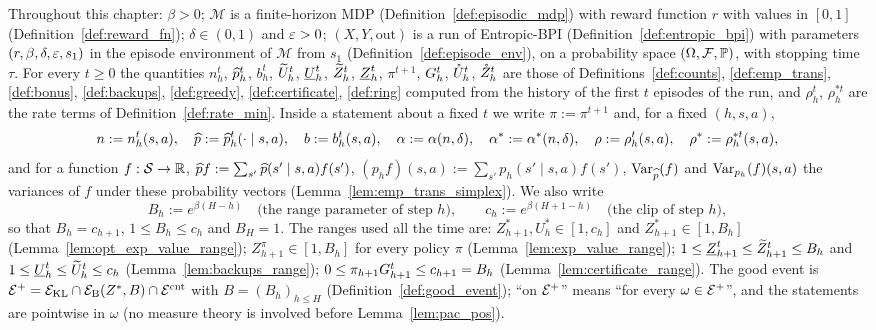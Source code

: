Throughout this chapter: $\beta > 0$; $\mathcal M$ is a finite-horizon MDP
(Definition~\ref{def:episodic_mdp}) with reward function $r$ with values in $[0, 1]$
(Definition~\ref{def:reward_fn}); $\delta \in (0, 1)$ and $\varepsilon > 0$; $(X, Y, \mathrm{out})$ is a run
of Entropic-BPI (Definition~\ref{def:entropic_bpi}) with parameters $(r, \beta, \delta, \varepsilon, s_1)$
in the episode environment of $\mathcal M$ from $s_1$ (Definition~\ref{def:episode_env}), on a
probability space $(\Omega, \mathcal F, \mathbb{P})$, with stopping time $\tau$. For every $t \ge 0$ the
quantities $n_h^t$, $\widehat{p}_h^t$, $b_h^t$, $\widetilde{U}_h^t$, $\underline{U}_h^t$, $\widetilde{Z}_h^t$, $\underline{Z}_h^t$, $\pi^{t+1}$,
$G_h^t$, $\mathring{U}_h^t$, $\mathring{Z}_h^t$ are those of Definitions~\ref{def:counts}, \ref{def:emp_trans},
\ref{def:bonus}, \ref{def:backups}, \ref{def:greedy}, \ref{def:certificate}, \ref{def:ring}
computed from the history of the first $t$ episodes of the run, and $\rho_h^t$, $\rho^{*t}_h$
are the rate terms of Definition~\ref{def:rate_min}. Inside a statement about a fixed $t$ we
write $\pi := \pi^{t+1}$ and, for a fixed $(h, s, a)$,
\[
  n := n_h^t(s,a), \quad \widehat{p} := \widehat{p}_h^t(\cdot \mid s, a), \quad b := b_h^t(s,a), \quad
  \alpha := \alpha(n, \delta), \quad \alpha^* := \alpha^*(n, \delta), \quad
  \rho := \rho_h^t(s,a), \quad \rho^* := \rho^{*t}_h(s,a),
\]
and for a function $f : \mathcal{S} \to \mathbb{R}$, $\widehat{p} f := \sum_{s'} \widehat{p}(s' \mid s,a) f(s')$,
$(p_h f)(s,a) := \sum_{s'} p_h(s' \mid s,a) f(s')$, $\operatorname{Var}_{\widehat{p}}(f)$ and $\operatorname{Var}_{p_h}(f)(s,a)$
the variances of $f$ under these probability vectors (Lemma~\ref{lem:emp_trans_simplex}).
We also write
\[
  B_h := e^{\beta (H - h)} \quad \text{(the range parameter of step $h$)}, \qquad
  c_h := e^{\beta (H + 1 - h)} \quad \text{(the clip of step $h$)},
\]
so that $B_h = c_{h+1}$, $1 \le B_h \le c_h$ and $B_H = 1$. The ranges used all the time are:
$Z^*_{h+1}, U^*_h \in [1, c_h]$ and $Z^*_{h+1} \in [1, B_h]$ (Lemma~\ref{lem:opt_exp_value_range});
$Z^\pi_{h+1} \in [1, B_h]$ for every policy $\pi$ (Lemma~\ref{lem:exp_value_range});
$1 \le \underline{Z}_{h+1}^t \le \widetilde{Z}_{h+1}^t \le B_h$ and $1 \le \underline{U}_h^t \le \widetilde{U}_h^t \le c_h$
(Lemma~\ref{lem:backups_range}); $0 \le \pi_{h+1}G_{h+1}^t \le c_{h+1} = B_h$
(Lemma~\ref{lem:certificate_range}). The good event is $\mathcal{E}^+ = \mathcal{E}_{\mathrm{KL}} \cap \mathcal{E}_{\mathrm{B}}(Z^*, B) \cap \mathcal{E}^{\mathrm{cnt}}$
with $B = (B_h)_{h \le H}$ (Definition~\ref{def:good_event}); ``on $\mathcal{E}^+$'' means ``for every
$\omega \in \mathcal{E}^+$'', and the statements are pointwise in $\omega$ (no measure theory is
involved before Lemma~\ref{lem:pac_pos}).

